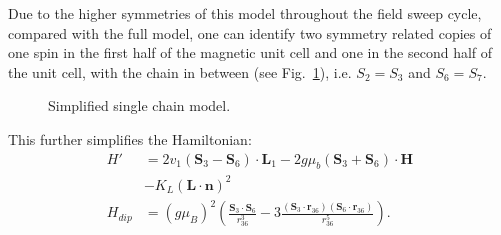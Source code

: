 Due to the higher symmetries of this model throughout the field sweep cycle, compared with the full model, one can identify two symmetry related copies of one spin in the first half of the magnetic unit cell and one in the second half of the unit cell, with the chain in between (see Fig.~\ref{fig:GdMn2O5_simple_model}), i.e. $S_2 = S_3$ and $S_6 = S_7$.
\begin{figure}
	\caption{\label{fig:GdMn2O5_simple_model} Simplified single chain model.}
\end{figure}
This further simplifies the Hamiltonian:
\begin{align}
	H' &= 2v_1(\mathbf{S}_3 - \mathbf{S}_6)\cdot\mathbf{L}_1 - 2g \mu_b (\mathbf{S}_3 + \mathbf{S}_6) \cdot \mathbf{H} \\
	&- K_L (\mathbf{L} \cdot \mathbf{n})^2 \\
	H_{dip} &= (g \mu_B)^2\left(\frac{\mathbf{S}_3\cdot \mathbf{S}_6}{r_{36}^3}-3\frac{(\mathbf{S}_3\cdot \mathbf{r}_{36})(\mathbf{S}_6\cdot \mathbf{r}_{36})}{r_{36}^5}\right).
\end{align}

\printbibliography
